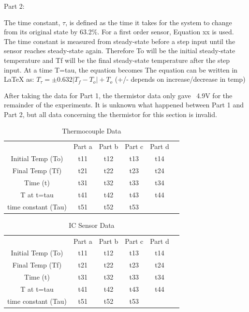 \documentclass{article}
\begin{document}
Part 2: %

The time constant, \(\tau\),  is defined as the time it takes for the system to change from its original state by 63.2\%.  For a first order sensor, Equation xx is used.  The time constant is measured from steady-state before a step input until the sensor reaches steady-state again.  Therefore To will be the initial steady-state temperature and Tf will be the final steady-state temperature after the step input. 
At a time T=tau, the equation becomes The equation can be written in LaTeX as: \( T_{\tau} = \pm 0.632|T_f - T_o| + T_o \) (+/- depends on increase/decrease in temp) 

After taking the data for Part 1, the thermistor data only gave ~4.9V for the remainder of the experiments.  It is unknown what happened between Part 1 and Part 2, but all data concerning the thermistor for this section is invalid.  

\begin{table}
    \centering
    \begin{tabular}{cccccc}
         &  Part a&  Part b&  Part c&  Part d& \\
         Initial Temp (To)&  t11&  t12&  t13&  t14& \\
         Final Temp (Tf)&  t21&  t22&  t23&  t24& \\
         Time (t)&  t31&  t32&  t33&  t34& \\
         T at t=tau&  t41&  t42&  t43&  t44& \\
         time constant (Tau)&  t51&  t52&  t53&  & \\
    \end{tabular}
    \caption{Thermocouple Data}
    \label{tab:sudden_temp}
\end{table}

\begin{table}
    \centering
    \begin{tabular}{cccccc}
         &  Part a&  Part b&  Part c&  Part d& \\
         Initial Temp (To)&  t11&  t12&  t13&  t14& \\
         Final Temp (Tf)&  t21&  t22&  t23&  t24& \\
         Time (t)&  t31&  t32&  t33&  t34& \\
         T at t=tau&  t41&  t42&  t43&  t44& \\
         time constant (Tau)&  t51&  t52&  t53&  & \\
    \end{tabular}
    \caption{IC Sensor Data}
    \label{tab:sudden_temp2}
\end{table}
\end{document}

